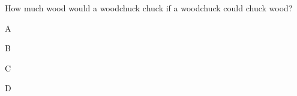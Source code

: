 \documentclass[11pt,nochoiceboxes,solutions,internaltesting]{exam3}
\begin{document}
%
%
\begin{problem}{2}
  How much wood would a woodchuck chuck if a woodchuck could chuck wood?
  \begin{multichoice}[v1=abcde,v2=edcba,v3=abedc,v4=cdeba]
    \item *A
    \item B
    \item C
    \item D
  \end{multichoice}
\end{problem}


\showpoints
\end{document}
